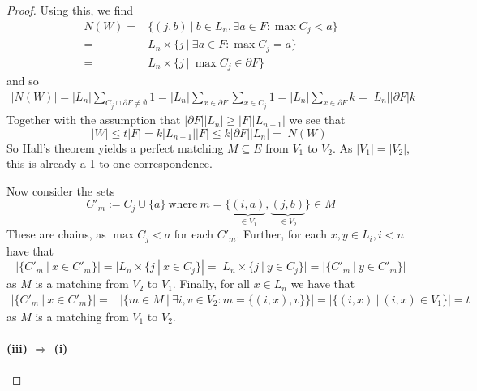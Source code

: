 \documentclass{scrartcl}
\theoremstyle{definition}
\begin{document}
\begin{proof}
    Using this, we find
    \begin{align*}
        N(W) =& \{ (j, b) \ | \ b \in L_n, \exists a \in F: \max C_j < a \} \\
        =& L_n \times \{ j \ | \ \exists a \in F: \max C_j = a \} \\
        =& L_n \times \{ j \ | \ \max C_j \in \partial F \}
    \end{align*}
    and so
    \begin{align*}
        |N(W)| = |L_n| \sum_{C_j \cap \partial F \neq \emptyset} 1 = |L_n| \sum_{x \in \partial F} \sum_{x \in C_j} 1 = |L_n| \sum_{x \in \partial F} k = |L_n| |\partial F| k
    \end{align*}
    Together with the assumption that $|\partial F| |L_n| \geq |F| |L_{n - 1}|$ we see that
    \begin{equation*}
        |W| \leq t |F| = k |L_{n - 1}| |F| \leq k |\partial F| |L_n| = |N(W)|
    \end{equation*}
    So Hall's theorem yields a perfect matching $M \subseteq E$ from $V_1$ to $V_2$.
    As $|V_1| = |V_2|$, this is already a 1-to-one correspondence.

    Now consider the sets
    \begin{equation*}
        C'_m := C_j \cup \{ a \} \ \text{where} \ m = \{\underbrace{(i, a)}_{\in V_1}, \underbrace{(j, b)}_{\in V_2}\} \in M
    \end{equation*}
    These are chains, as $\max C_j < a$ for each $C'_m$.
    Further, for each $x, y \in L_i, i < n$ have that
    \begin{equation*}
        |\{ C'_m \ | \ x \in C'_m \}| = |L_n \times \{ j \ | \ x \in C_j \}| = |L_n \times \{ j \ | \ y \in C_j \}| = |\{ C'_m \ | \ y \in C'_m \}|
    \end{equation*}
    as $M$ is a matching from $V_2$ to $V_1$.
    Finally, for all $x \in L_n$ we have that
    \begin{align*}
        |\{ C'_m \ | \ x \in C'_m \}| =& |\{ m \in M \ | \ \exists i, v \in V_2: m = \{ (i, x), v \} \}| = |\{ (i, x) \ | \ (i, x) \in V_1 \}| = t
    \end{align*}
    as $M$ is a matching from $V_1$ to $V_2$.
    \paragraph{(iii) $\Rightarrow$ (i)}
\end{proof}
\end{document}

